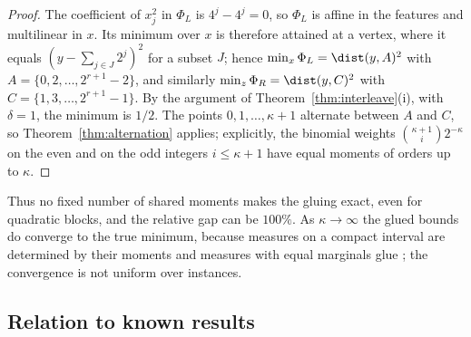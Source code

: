 \begin{proof}
The coefficient of $x_j^2$ in $\Phi_L$ is $4^j-4^j=0$, so $\Phi_L$ is affine
in the features and multilinear in $x$. Its minimum over $x$ is therefore
attained at a vertex, where it equals $(y-\sum_{j\in J}2^j)^2$ for a subset
$J$; hence $\min_x\Phi_L=\dist(y,A)^2$ with $A=\{0,2,\dots,2^{r+1}-2\}$, and
similarly $\min_z\Phi_R=\dist(y,C)^2$ with $C=\{1,3,\dots,2^{r+1}-1\}$. By the
argument of Theorem~\ref{thm:interleave}(i), with $\delta=1$, the minimum is
$1/2$. The points $0,1,\dots,\kappa+1$ alternate between $A$ and $C$, so
Theorem~\ref{thm:alternation} applies; explicitly, the binomial weights
$\binom{\kappa+1}i2^{-\kappa}$ on the even and on the odd integers
$i\le\kappa+1$ have equal moments of orders up to $\kappa$.
\end{proof}

Thus no fixed number of shared moments makes the gluing exact, even for
quadratic blocks, and the relative gap can be $100\%$. As $\kappa\to\infty$
the glued bounds do converge to the true minimum, because measures on a
compact interval are determined by their moments and measures with equal
marginals glue \citep[Lemma~6.3]{Lasserre2006}; the convergence is not
uniform over instances.

\subsection{Relation to known results}\label{sec:composition-literature}


